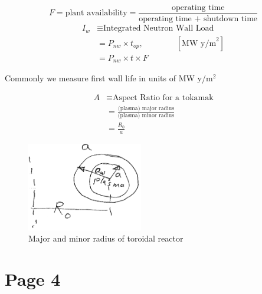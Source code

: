 \documentclass[11pt]{report} %
\begin{document}
\begin{equation}
	F = \text{plant availability} = \frac{\text{operating time}}{\text{operating time + shutdown time}}
\end{equation}
\begin{align}
  I_w & \equiv \text{Integrated Neutron Wall Load} \\
      & = P_{nw} \times t_{op},  \qquad \qquad [\text{MW y/m}^2] \\
      & = P_{nw} \times t \times F
\end{align}


Commonly we measure first wall life in units of MW y/m$^2$

\begin{align}
  A & \equiv \text{Aspect Ratio for a tokamak} \\
    & = \frac{\text{(plasma) major radius}}{\text{(plasma) minor radius}} \\
    & = \frac{R_0}{a}
\end{align}


\begin{figure}[!htp]
  \centering
  \includegraphics[width=0.45\textwidth]{sketches/sketch1.png}
  \caption[width=\textwidth]{Major and minor radius of toroidal reactor}
  \label{fig:reactorRadius}
\end{figure}

\section{Page 4}
\end{document}
